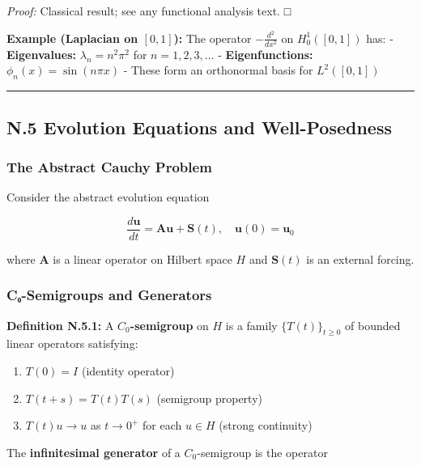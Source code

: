 \documentclass[
]{article}
\providecommand{\tightlist}{%
  \setlength{\itemsep}{0pt}\setlength{\parskip}{0pt}}
\begin{document}
\emph{Proof:} Classical result; see any functional analysis text. □

\textbf{Example (Laplacian on \([0,1]\)):} The operator
\(-\frac{d^2}{dx^2}\) on \(H^1_0([0,1])\) has: - \textbf{Eigenvalues:}
\(\lambda_n = n^2\pi^2\) for \(n = 1, 2, 3, \ldots\) -
\textbf{Eigenfunctions:} \(\phi_n(x) = \sin(n\pi x)\) - These form an
orthonormal basis for \(L^2([0,1])\)

\begin{center}\rule{0.5\linewidth}{0.5pt}\end{center}

\subsection{N.5 Evolution Equations and
Well-Posedness}\label{n.5-evolution-equations-and-well-posedness}

\subsubsection{The Abstract Cauchy
Problem}\label{the-abstract-cauchy-problem}

Consider the abstract evolution equation

\[\frac{d\mathbf{u}}{dt} = \mathbf{A}\mathbf{u} + \mathbf{S}(t), \quad \mathbf{u}(0) = \mathbf{u}_0\]

where \(\mathbf{A}\) is a linear operator on Hilbert space \(H\) and
\(\mathbf{S}(t)\) is an external forcing.

\subsubsection{C₀-Semigroups and
Generators}\label{cux2080-semigroups-and-generators}

\textbf{Definition N.5.1:} A \textbf{\(C_0\)-semigroup} on \(H\) is a
family \(\{T(t)\}_{t \geq 0}\) of bounded linear operators satisfying:

\begin{enumerate}
\def\labelenumi{\arabic{enumi}.}
\tightlist
\item
  \(T(0) = I\) (identity operator)
\item
  \(T(t+s) = T(t)T(s)\) (semigroup property)
\item
  \(T(t)u \to u\) as \(t \to 0^+\) for each \(u \in H\) (strong
  continuity)
\end{enumerate}

The \textbf{infinitesimal generator} of a \(C_0\)-semigroup is the
operator
\end{document}
